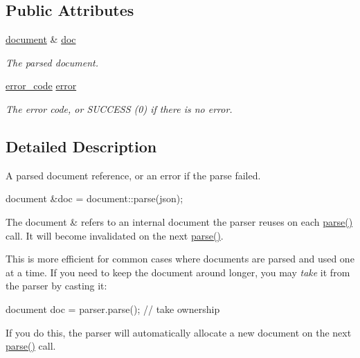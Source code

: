 \subsection*{Public Attributes}
\begin{DoxyCompactItemize}
\item 
\hyperlink{classsimdjson_1_1document}{document} \& \hyperlink{classsimdjson_1_1document_1_1doc__ref__result_ad51d8d8caeded41e300bb9b4713a6f96}{doc}
\begin{DoxyCompactList}\small\item\em The parsed document. \end{DoxyCompactList}\item 
\mbox{\label{classsimdjson_1_1document_1_1doc__ref__result_a779ace3a575c5962a9819314d9cabfc9}} 
\hyperlink{namespacesimdjson_a7b735a3a50ba79e3f7f14df5f77d8da9}{error\+\_\+code} \hyperlink{classsimdjson_1_1document_1_1doc__ref__result_a779ace3a575c5962a9819314d9cabfc9}{error}
\begin{DoxyCompactList}\small\item\em The error code, or S\+U\+C\+C\+E\+SS (0) if there is no error. \end{DoxyCompactList}\end{DoxyCompactItemize}


\subsection{Detailed Description}
A parsed document reference, or an error if the parse failed. 

document \&doc = document\+::parse(json);

The {\ttfamily document \&} refers to an internal document the parser reuses on each {\ttfamily \hyperlink{classsimdjson_1_1document_a6f11cda7c4a06fffdc00fdc97d98ae2b}{parse()}} call. It will become invalidated on the next {\ttfamily \hyperlink{classsimdjson_1_1document_a6f11cda7c4a06fffdc00fdc97d98ae2b}{parse()}}.

This is more efficient for common cases where documents are parsed and used one at a time. If you need to keep the document around longer, you may {\itshape take} it from the parser by casting it\+: \begin{DoxyVerb}document doc = parser.parse(); // take ownership
\end{DoxyVerb}


If you do this, the parser will automatically allocate a new document on the next {\ttfamily \hyperlink{classsimdjson_1_1document_a6f11cda7c4a06fffdc00fdc97d98ae2b}{parse()}} call.

